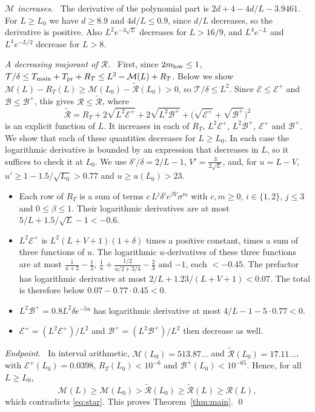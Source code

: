 \documentclass[11pt]{amsart}
\theoremstyle{remark}
\newcommand{\step}[1]{\smallskip\noindent\textit{#1.}\ }
\begin{document}
\step{$\mathcal M$ increases} The derivative of the polynomial part is $2d+4-4d/L-3.9461$. For $L\ge L_0$ we have $d\ge8.9$ and $4d/L\le0.9$, since $d/L$ decreases, so the derivative is positive. Also $L^2e^{-3\sqrt L}$ decreases for $L>16/9$, and $L^4e^{-L}$ and $L^4e^{-L/2}$ decrease for $L>8$.

\step{A decreasing majorant of $\mathcal R$} First, since $2m_{\rm low}\le1$, $\mathcal T/\delta\le T_{\rm main}+T_{\rm pr}+R_T\le L^2-\mathcal M(L)+R_T$. Below we show $\mathcal M(L)-R_T(L)\ge\mathcal M(L_0)-\widetilde{\mathcal R}(L_0)>0$, so $\mathcal T/\delta\le L^2$. Since $\mathcal E\le\mathcal E^+$ and $\mathcal B\le\mathcal B^+$, this gives $\mathcal R\le\widetilde{\mathcal R}$, where
\[
\widetilde{\mathcal R}=R_T+2\sqrt{L^2\mathcal E^+}+2\sqrt{L^2\mathcal B^+}+\big(\sqrt{\mathcal E^+}+\sqrt{\mathcal B^+}\big)^2
\]
is an explicit function of $L$. It increases in each of $R_T$, $L^2\mathcal E^+$, $L^2\mathcal B^+$, $\mathcal E^+$ and $\mathcal B^+$. We show that each of these quantities decreases for $L\ge L_0$. In each case the logarithmic derivative is bounded by an expression that decreases in $L$, so it suffices to check it at $L_0$. We use $\delta'/\delta=2/L-1$, $V'=\frac3{2\sqrt L}$, and, for $u=L-V$, $u'\ge1-1.5/\sqrt{L_0}>0.77$ and $u\ge u(L_0)>23$.
\begin{itemize}
\item Each row of $R_T$ is a sum of terms $c\,L^j\delta^ie^{\beta V}\sigma^m$ with $c,m\ge0$, $i\in\{1,2\}$, $j\le3$ and $0\le\beta\le1$. Their logarithmic derivatives are at most $5/L+1.5/\sqrt L-1<-0.6$.
\item $L^2\mathcal E^+$ is $L^2(L+V+1)(1+\delta)$ times a positive constant, times a sum of three functions of $u$. The logarithmic $u$-derivatives of these three functions are at most $\frac1{u+2}-\frac12$, $\frac1u+\frac{1/2}{u/2+3/4}-\frac23$ and $-1$, each $<-0.45$. The prefactor has logarithmic derivative at most $2/L+1.23/(L+V+1)<0.07$. The total is therefore below $0.07-0.77\cdot0.45<0$.
\item $L^2\mathcal B^+=0.8L^2\delta e^{-5u}$ has logarithmic derivative at most $4/L-1-5\cdot0.77<0$.
\item $\mathcal E^+=(L^2\mathcal E^+)/L^2$ and $\mathcal B^+=(L^2\mathcal B^+)/L^2$ then decrease as well.
\end{itemize}

\step{Endpoint} In interval arithmetic, $\mathcal M(L_0)=513.87\ldots$ and $\widetilde{\mathcal R}(L_0)=17.11\ldots$, with $\mathcal E^+(L_0)=0.0398$, $R_T(L_0)<10^{-6}$ and $\mathcal B^+(L_0)<10^{-65}$. Hence, for all $L\ge L_0$,
\[
\mathcal M(L)\ge\mathcal M(L_0)>\widetilde{\mathcal R}(L_0)\ge\widetilde{\mathcal R}(L)\ge\mathcal R(L),
\]
which contradicts \eqref{eq:star}. This proves Theorem~\ref{thm:main}. \qed
\end{document}
